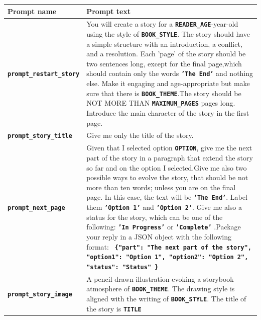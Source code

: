 \documentclass[conference]{IEEEtran}
\begin{document}
	\begin{table}[H]
	\centering
	\begin{tabular}{|l|p{8cm}|}
		\hline
		Prompt name & Prompt text \\ \hline
		\textbf{\texttt{prompt\_restart\_story}} & You will create a story for a \textbf{\texttt{READER\_AGE}}-year-old using the style of \textbf{\texttt{BOOK\_STYLE}}. The story should have a simple structure with an introduction, a conflict, and a resolution. Each 'page' of the story should be two sentences long, except for the final page,which should contain only the words \textbf{\texttt{'The End'}} and nothing else. Make it engaging and age-appropriate but make sure that there is \textbf{\texttt{BOOK\_THEME}}.The story should be NOT MORE THAN \textbf{\texttt{MAXIMUM\_PAGES}} pages long. Introduce the main character of the story in the first page. \\ \hline
		
		\textbf{\texttt{prompt\_story\_title}} & Give me only the title of the story. \\ \hline
		
		\textbf{\texttt{prompt\_next\_page}} & Given that I selected option \textbf{\texttt{OPTION}}, give me the next part of the story in a paragraph that extend the story so far and on the option I selected.Give me also two possible ways to evolve the story, that should be not more than ten words; unless you are on the final page. In this case, the text will be \textbf{\texttt{'The End'}}. Label them \textbf{\texttt{'Option 1'}} and \textbf{\texttt{'Option 2'}}. Give me also a status for the story, which can be one of the following: \textbf{\texttt{'In Progress'}} or \textbf{\texttt{'Complete'}} .Package your reply in a JSON object with the following format: \textbf{\texttt{ \{"part": "The next part of the story", "option1": "Option 1", "option2": "Option 2", "status": "Status" \} }} \\ \hline
		
		\textbf{\texttt{prompt\_story\_image}} & A pencil-drawn illustration evoking a storybook atmosphere of \textbf{\texttt{BOOK\_THEME}}. The drawing style is aligned with the writing of \textbf{\texttt{BOOK\_STYLE}}. The title of the story is \textbf{\texttt{TITLE}} \\ \hline
	\end{tabular}
\end{table}

	
\end{document}
